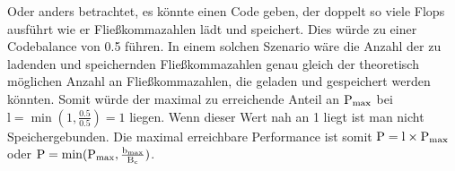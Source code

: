 \documentclass{article}
\begin{document}
    Oder anders betrachtet, es könnte einen Code geben,
    der doppelt so viele Flops ausführt wie er Fließkommazahlen lädt und speichert. 
    Dies würde zu einer Codebalance von 0.5 führen. 
    In einem solchen Szenario wäre die Anzahl 
    der zu ladenden und speichernden Fließkommazahlen genau gleich der theoretisch möglichen Anzahl
    an Fließkommazahlen, die geladen und gespeichert werden könnten. 
    Somit würde der maximal zu erreichende Anteil an 
    $\textnormal{P}_{\textnormal{max}}$ bei $\text{l} = \min(1, \frac{0.5}{0.5}) = 1$ liegen.  %
    Wenn dieser Wert nah an 1 liegt ist man nicht Speichergebunden.
    Die maximal erreichbare Performance ist somit $\textnormal{P} =  \textnormal{l} \times \textnormal{P}_{\textnormal{max}}$ oder 
    $\textnormal{P} =  \min(\textnormal{P}_{\textnormal{max}}, \frac{\textnormal{b}_{\textnormal{max}}}{\textnormal{B}_{\textnormal{c}}})$.
\end{document}
